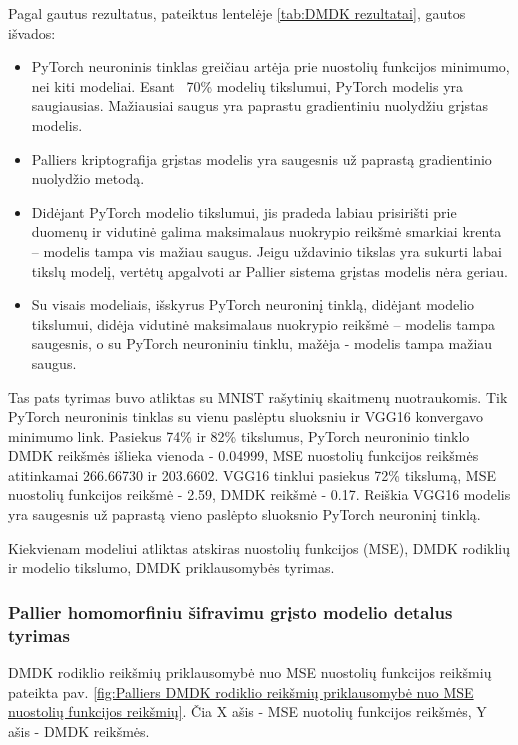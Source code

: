 \documentclass{VUMIFInfBakalaurinis}
\begin{document}
\par Pagal gautus rezultatus, pateiktus lentelėje \ref{tab:DMDK rezultatai}, gautos išvados:
\begin{itemize}
    \item PyTorch neuroninis tinklas greičiau artėja prie nuostolių funkcijos minimumo, nei kiti modeliai. Esant ~70\% modelių tikslumui, PyTorch modelis yra saugiausias. Mažiausiai saugus yra paprastu gradientiniu nuolydžiu grįstas modelis. 
    \item Palliers kriptografija grįstas modelis yra saugesnis už paprastą gradientinio nuolydžio metodą.
    \item Didėjant PyTorch modelio tikslumui, jis pradeda labiau prisirišti prie duomenų ir vidutinė galima maksimalaus nuokrypio reikšmė smarkiai krenta – modelis tampa vis mažiau saugus. Jeigu uždavinio tikslas yra sukurti labai tikslų modelį, vertėtų apgalvoti ar Pallier sistema grįstas modelis nėra geriau.
    \item Su visais modeliais, išskyrus PyTorch neuroninį tinklą, didėjant modelio tikslumui, didėja vidutinė maksimalaus nuokrypio reikšmė – modelis tampa saugesnis, o su PyTorch neuroniniu tinklu, mažėja - modelis tampa mažiau saugus. 
\end{itemize}

\par Tas pats tyrimas buvo atliktas su MNIST rašytinių skaitmenų nuotraukomis. Tik PyTorch neuroninis tinklas su vienu paslėptu sluoksniu ir VGG16 konvergavo minimumo link. Pasiekus 74\% ir 82\% tikslumus, PyTorch neuroninio tinklo DMDK reikšmės išlieka vienoda - 0.04999, MSE nuostolių funkcijos reikšmės atitinkamai 266.66730 ir 203.6602. VGG16 tinklui pasiekus 72\% tikslumą, MSE nuostolių funkcijos reikšmė - 2.59, DMDK reikšmė -  0.17. Reiškia VGG16 modelis yra saugesnis už paprastą vieno paslėpto sluoksnio PyTorch neuroninį tinklą.

\par Kiekvienam modeliui atliktas atskiras nuostolių funkcijos (MSE), DMDK rodiklių ir modelio tikslumo, DMDK priklausomybės tyrimas.

\subsubsection{Pallier homomorfiniu šifravimu grįsto modelio detalus tyrimas}
\par DMDK rodiklio reikšmių priklausomybė nuo MSE nuostolių funkcijos reikšmių pateikta pav. \ref{fig:Palliers DMDK rodiklio reikšmių priklausomybė nuo MSE nuostolių funkcijos reikšmių}. Čia X ašis - MSE nuotolių funkcijos reikšmės, Y ašis - DMDK reikšmės. 
\end{document}
